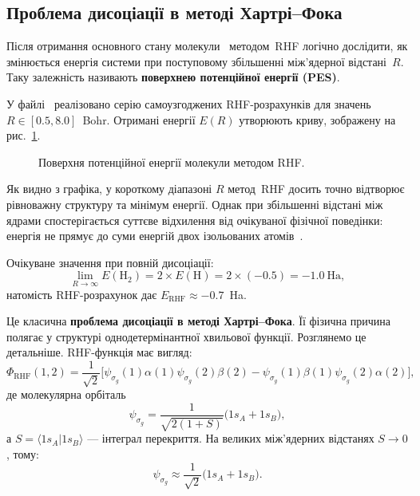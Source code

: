 \subsection{Проблема дисоціації в методі Хартрі–Фока}

Після отримання основного стану молекули~ методом~RHF
логічно дослідити, як змінюється енергія системи
при поступовому збільшенні між'ядерної відстані~$R$.
Таку залежність називають \textbf{поверхнею потенційної енергії (PES)}.

У файлі~
реалізовано серію самоузгоджених RHF-роз\-ра\-хунків
для значень $R \in [0.5, 8.0]$~Bohr.
Отримані енергії $E(R)$ утворюють криву, зображену на рис.~\ref{pic:h2_rhf}.

\begin{figure}[h!]\centering
	
	\caption{Поверхня потенційної енергії молекули  методом RHF.}
	\label{pic:h2_rhf}
\end{figure}

Як видно з графіка, у короткому діапазоні $R$ метод~RHF досить точно
відтворює рівноважну структуру та мінімум енергії.
Однак при збільшенні відстані між ядрами спостерігається
суттєве відхилення від очікуваної фізічної поведінки:
енергія не прямує до суми енергій двох ізольованих атомів~.

Очікуване значення при повній дисоціації:
\[
	\lim_{R \to \infty} E(\text{H}_2)
	= 2 \times E(\text{H})
	= 2 \times (-0.5) = -1.0~\text{Ha},
\]
натомість RHF-розрахунок дає $E_{\text{RHF}} \approx -0.7$~Ha.

Це класична \textbf{проблема дисоціації в методі Хартрі–Фока}.
Її фізична причина полягає у структурі однодетермінантної хвильової функції.
Розглянемо це детальніше. RHF-функція має вигляд:
\[
	\Phi_{\text{RHF}}(1,2)
	= \frac{1}{\sqrt{2}}
	\Big[
		\psi_{\sigma_g}(1)\alpha(1)\psi_{\sigma_g}(2)\beta(2)
		- \psi_{\sigma_g}(1)\beta(1)\psi_{\sigma_g}(2)\alpha(2)
		\Big],
\]
де молекулярна орбіталь
\[
	\psi_{\sigma_g} = \frac{1}{\sqrt{2(1+S)}}\big(1s_A + 1s_B\big),
\]
а \(S = \langle 1s_A | 1s_B \rangle\) --- інтеграл перекриття.
На великих між'ядерних відстанях \(S \to 0\), тому:
\[
	\psi_{\sigma_g} \approx \frac{1}{\sqrt{2}}\big(1s_A + 1s_B\big).
\]

